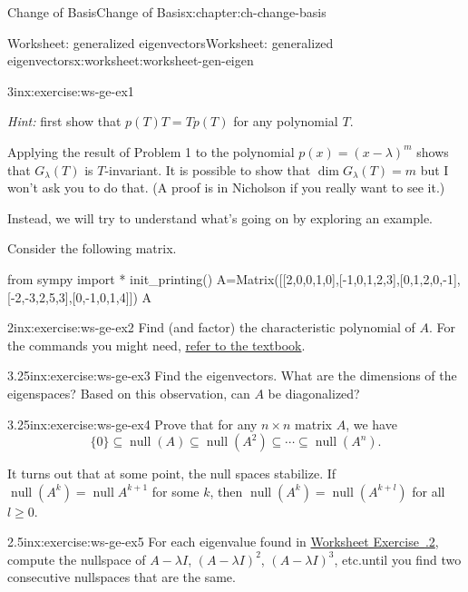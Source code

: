 \documentclass[oneside,10pt,]{book}
\newcommand{\xreffont}{\relax}
\numberwithin{equation}{section}
\begin{document}
\begin{chapterptx}{Change of Basis}{}{Change of Basis}{}{}{x:chapter:ch-change-basis}
\begin{worksheet-section}{Worksheet: generalized eigenvectors}{}{Worksheet: generalized eigenvectors}{}{}{x:worksheet:worksheet-gen-eigen}
\begin{divisionexercise}{1}{}{3in}{x:exercise:ws-ge-ex1}
\par
\emph{Hint:} first show that \(p(T)T=Tp(T)\) for any polynomial \(T\).%
\end{divisionexercise}%
Applying the result of Problem 1 to the polynomial \(p(x) = (x-\lambda)^m\) shows that \(G_\lambda(T)\) is \(T\)-invariant. It is possible to show that \(\dim G_\lambda(T)=m\) but I won't ask you to do that. (A proof is in Nicholson if you really want to see it.)%
\par
Instead, we will try to understand what's going on by exploring an example.%
\par
Consider the following matrix.%
\begin{sageinput}
from sympy import *
init_printing()
A=Matrix([[2,0,0,1,0],[-1,0,1,2,3],[0,1,2,0,-1],[-2,-3,2,5,3],[0,-1,0,1,4]])
A
\end{sageinput}
\begin{divisionexercise}{2}{}{2in}{x:exercise:ws-ge-ex2}%
Find (and factor) the characteristic polynomial of \(A\). For the commands you might need, \href{https://opentext.uleth.ca/Math3410/sec-sympy.html}{refer to the textbook}\footnotemark{}.%
\end{divisionexercise}%
%
\clearpage
\begin{divisionexercise}{3}{}{3.25in}{x:exercise:ws-ge-ex3}%
Find the eigenvectors. What are the dimensions of the eigenspaces? Based on this observation, can \(A\) be diagonalized?%
\end{divisionexercise}%
\begin{divisionexercise}{4}{}{3.25in}{x:exercise:ws-ge-ex4}%
Prove that for any \(n\times n\) matrix \(A\), we have%
\begin{equation*}
\{0\}\subseteq \operatorname{null}(A)\subseteq \operatorname{null}(A^2) \subseteq \cdots \subseteq \operatorname{null}(A^n)\text{.}
\end{equation*}
%
\end{divisionexercise}%
\clearpage
It turns out that at some point, the null spaces stabilize. If \(\operatorname{null}(A^k)=\operatorname{null}A^{k+1}\) for some \(k\), then \(\operatorname{null}(A^k)=\operatorname{null}(A^{k+l})\) for all \(l\geq 0\).%
\begin{divisionexercise}{5}{}{2.5in}{x:exercise:ws-ge-ex5}%
For each eigenvalue found in \hyperlink{x:exercise:ws-ge-ex2}{Worksheet Exercise~{\xreffont 5.4.2}}, compute the nullspace of \(A-\lambda I\), \((A-\lambda I)^2\), \((A-\lambda I)^3\), etc.\@ until you find two consecutive nullspaces that are the same.%

\end{divisionexercise}
\end{worksheet-section}
\end{chapterptx}
\end{document}
